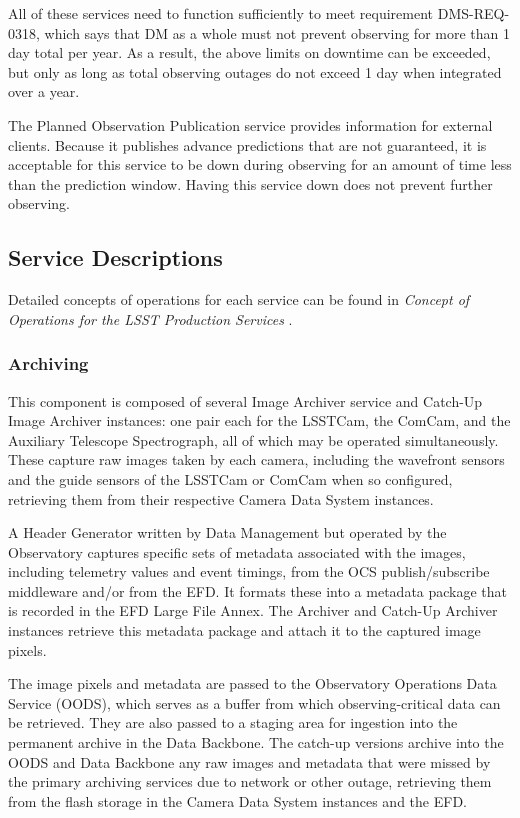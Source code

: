 \documentclass[DM,toc]{lsstdoc}
\begin{document}
All of these services need to function sufficiently to meet requirement DMS-REQ-0318, which says that DM as a whole must not prevent observing for more than 1 day total per year.
As a result, the above limits on downtime can be exceeded, but only as long as total observing outages do not exceed 1 day when integrated over a year.

The Planned Observation Publication service provides information for external clients.
Because it publishes advance predictions that are not guaranteed, it is acceptable for this service to be down during observing for an amount of time less than the prediction window.
Having this service down does not prevent further observing.

\subsection{Service Descriptions}\label{base-service-descriptions}

Detailed concepts of operations for each service can be found in
\textit{Concept of Operations for the LSST Production Services} .


\subsubsection{Archiving}\label{archiving}

This component is composed of several Image Archiver service and
Catch-Up Image Archiver instances: one pair each for the LSSTCam, the
ComCam, and the Auxiliary Telescope Spectrograph, all of which may be
operated simultaneously. These capture raw images taken by each camera,
including the wavefront sensors and the guide sensors of the LSSTCam or
ComCam when so configured, retrieving them from their respective Camera
Data System instances.

A Header Generator written by Data Management but operated by the Observatory captures specific sets of metadata
associated with the images, including telemetry values and event
timings, from the OCS publish/subscribe middleware and/or from the EFD.
It formats these into a metadata package that is recorded in the EFD Large File Annex.
The Archiver and Catch-Up Archiver instances retrieve this metadata package and attach it to the captured image pixels.

The image pixels and metadata are passed to the Observatory Operations Data Service (OODS), which serves as a buffer from which observing-critical data can be retrieved.
They are also passed to a staging area for ingestion into the permanent archive in the Data Backbone.
The catch-up versions archive into the OODS and Data Backbone any raw
images and metadata that were missed by the primary archiving services
due to network or other outage, retrieving them from the flash storage
in the Camera Data System instances and the EFD.
\end{document}
